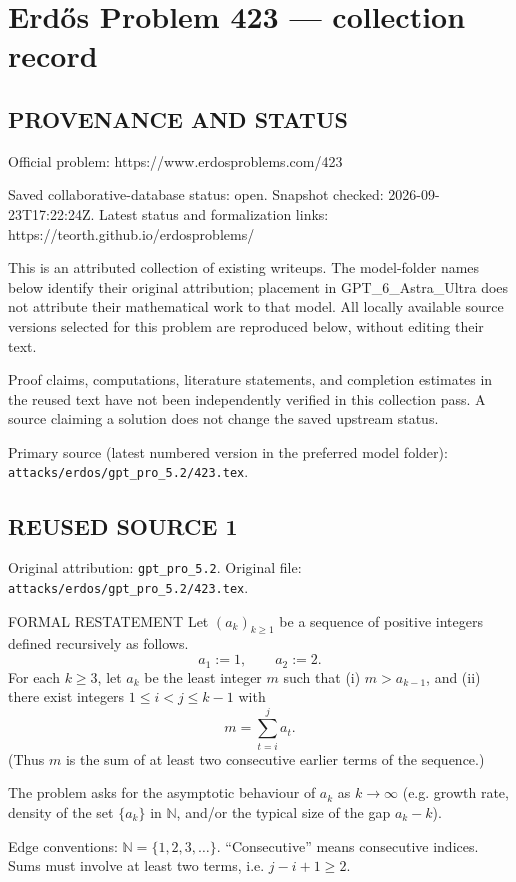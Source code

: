 \section*{Erd\H{o}s Problem 423 --- collection record}

\subsection*{PROVENANCE AND STATUS}
Official problem: https://www.erdosproblems.com/423

Saved collaborative-database status: open.
Snapshot checked: 2026-09-23T17:22:24Z.
Latest status and formalization links: https://teorth.github.io/erdosproblems/

This is an attributed collection of existing writeups. The model-folder names below identify their original attribution; placement in GPT\_6\_Astra\_Ultra does not attribute their mathematical work to that model. All locally available source versions selected for this problem are reproduced below, without editing their text.

Proof claims, computations, literature statements, and completion estimates in the reused text have not been independently verified in this collection pass. A source claiming a solution does not change the saved upstream status.

Primary source (latest numbered version in the preferred model folder): \texttt{attacks/erdos/gpt\_pro\_5.2/423.tex}.

\subsection*{REUSED SOURCE 1}
Original attribution: \texttt{gpt\_pro\_5.2}.
Original file: \texttt{attacks/erdos/gpt\_pro\_5.2/423.tex}.


FORMAL RESTATEMENT
Let $(a_k)_{k\ge 1}$ be a sequence of positive integers defined recursively as follows.
\[
 a_1:=1,\qquad a_2:=2.
\]
For each $k\ge 3$, let $a_k$ be the least integer $m$ such that
(i) $m>a_{k-1}$, and
(ii) there exist integers $1\le i<j\le k-1$ with
\[
 m=\sum_{t=i}^j a_t.
\]
(Thus $m$ is the sum of at least two consecutive earlier terms of the sequence.)

The problem asks for the asymptotic behaviour of $a_k$ as $k\to\infty$ (e.g. growth rate, density of the set $\{a_k\}$ in $\mathbb N$, and/or the typical size of the gap $a_k-k$).

Edge conventions: $\mathbb N=\{1,2,3,\dots\}$. “Consecutive” means consecutive indices. Sums must involve at least two terms, i.e. $j-i+1\ge 2$.

